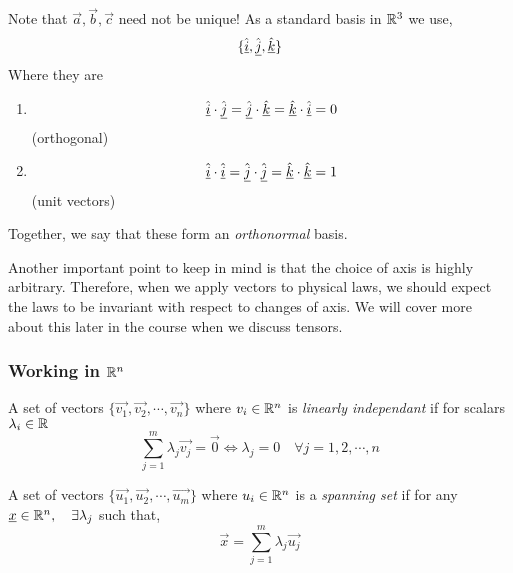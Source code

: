 \documentclass{article}
\numberwithin{equation}{section}
\begin{document}
\begin{remark}
    Note that $\vec{a}, \vec{b}, \vec{c}$ need not be unique! As a standard basis in $\mathbb{R}^3$ we use,
    \[
        \{\hat{\underline{i}}, \hat{\underline{j}}, \hat{\underline{k}}\}
    \]
    Where they are
    \begin{enumerate}
        \item \[
            \hat{\underline{i}} \cdot \hat{\underline{j}} = \hat{\underline{j}} \cdot \hat{\underline{k}} = \hat{\underline{k}} \cdot \hat{\underline{i}} = 0  
        \] \hspace*{\fill}(orthogonal)
        \item \[
            \hat{\underline{i}} \cdot \hat{\underline{i}} = \hat{\underline{j}} \cdot \hat{\underline{j}} = \hat{\underline{k}} \cdot \hat{\underline{k}} = 1 
        \] \hspace*{\fill}(unit vectors)
    \end{enumerate}
    Together, we say that these form an \emph{orthonormal} basis.

    Another important point to keep in mind is that the choice of axis is highly arbitrary. Therefore, when we apply vectors to physical laws, we should expect the laws to be invariant with respect to changes of axis. We will cover more about this later in the course when we discuss tensors.
\end{remark}

\subsubsection*{Working in $\mathbb{R}^n$}
\begin{defi}
    A set of vectors $\{\vec{v_1}, \vec{v_2}, \cdots, \vec{v_n}\}$ where $v_i \in \mathbb{R}^n$ is \emph{linearly independant} if for scalars $\lambda_i \in \mathbb{R}$
    \begin{equation}\label{eq:2-25}
        \sum_{j=1}^{m}{\lambda_j \vec{v_j}} = \vec{0} \Leftrightarrow \lambda_j = 0 \quad \forall j = 1, 2, \cdots, n
    \end{equation}
\end{defi}

\begin{defi}
    A set of vectors $\{\vec{u_1}, \vec{u_2}, \cdots, \vec{u_m}\}$ where $u_i \in \mathbb{R}^n$ is a \emph{spanning set} if for any $\underline{x} \in \mathbb{R}^n, \quad \exists \lambda_j$ such that,
    \begin{equation}\label{eq:2-26}
        \vec{x} = \sum_{j=1}^{m}{\lambda_j \vec{u_j}}
    \end{equation}
\end{defi}
\end{document}
